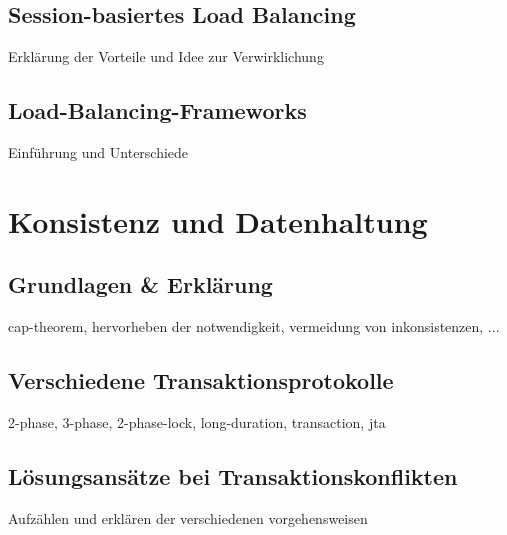 \documentclass[letterpaper, 12pt]{article}
\let\tempsection\section
\renewcommand\section[1]{\vspace{-0.3cm}\tempsection{#1}\vspace{-0.3cm}}
\let\tempsubsection\subsection
\renewcommand\subsection[1]{\vspace{0cm}\tempsubsection{#1}\vspace{0cm}}
\begin{document}
\subsection{Session-basiertes Load Balancing}

Erklärung der Vorteile und Idee zur Verwirklichung

\subsection{Load-Balancing-Frameworks}

Einführung und Unterschiede

\clearpage

\section{Konsistenz und Datenhaltung}

\subsection{Grundlagen \& Erklärung}

cap-theorem, hervorheben der notwendigkeit, vermeidung von inkonsistenzen, ...

\subsection{Verschiedene Transaktionsprotokolle}

2-phase, 3-phase, 2-phase-lock, long-duration, transaction, jta

\subsection{Lösungsansätze bei Transaktionskonflikten}

Aufzählen und erklären der verschiedenen vorgehensweisen

\clearpage

\clearpage


\lstlistoflistings
\listoffigures
\end{document}
